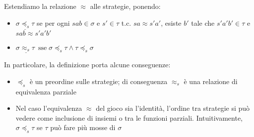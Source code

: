 \documentclass{beamer}
\begin{document}
\begin{frame}
 
 Estendiamo la relazione $\approx$ alle strategie, ponendo:
 \pause
	\begin{itemize}
	\item $\underline{ \sigma \preccurlyeq_s \tau }$ se per ogni $sab \in \sigma$ e $s' \in \tau$ t.c. $sa\approx s'a'$, esiste $b'$ tale che $s'a'b' \in \tau$ e $sab\approx s'a'b'$
	\item $\underline{ \sigma \approx_s \tau \ } \; \text{sse} \; \sigma \preccurlyeq_s \tau \wedge \tau \preccurlyeq_s \sigma$
	\end{itemize}  
	\pause
In particolare, la definizione porta alcune conseguenze: 

	\begin{itemize}
		\item $\preccurlyeq_s$ è un preordine sulle strategie; di conseguenza $\approx_s$ è una relazione di equivalenza parziale
		\item Nel caso l'equivalenza $\approx$ del gioco sia l'identità, l'ordine tra strategie si può vedere come inclusione di insiemi o tra le funzioni parziali. Intuitivamente, $\sigma \preccurlyeq_s \tau$ se $\tau$ può fare più mosse di $\sigma$
	\end{itemize}
	
\end{frame}
\end{document}
